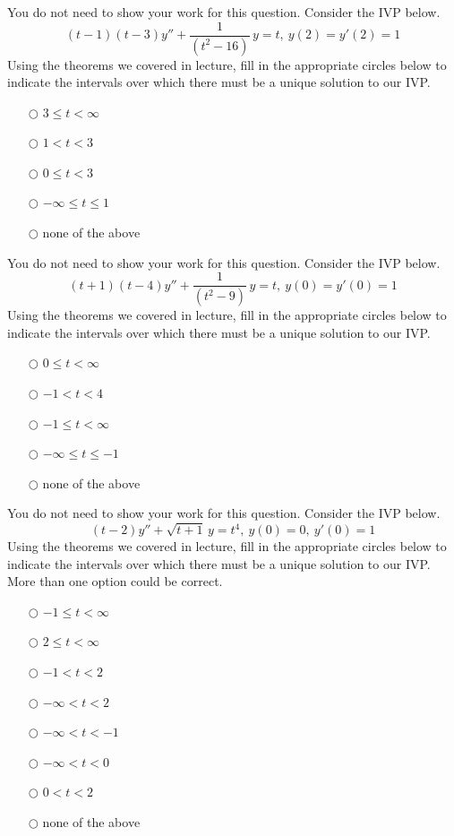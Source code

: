 \ifnum {}
\question[1] You do not need to show your work for this question. Consider the IVP below.
$$\displaystyle (t-1)(t-3) y'' + \frac{1}{(t^2-16)}\,y = t, \ y(2) = y'(2)= 1$$   
Using the theorems we covered in lecture, fill in the appropriate circles below to indicate the intervals over which there must be a unique solution to our IVP.
\begin{itemize}
    \item[$\bigcirc$] $3 \le t < \infty$
    \item[$\bigcirc$] $1 < t < 3$
    \item[$\bigcirc$] $0 \le t < 3$
    \item[$\bigcirc$] $-\infty \le t \le 1$
    \item[$\bigcirc$] none of the above
\end{itemize}
\fi


\ifnum {}
\question[1] You do not need to show your work for this question. Consider the IVP below.
$$\displaystyle (t+1)(t-4) y'' + \frac{1}{(t^2-9)}\,y = t, \ y(0) = y'(0)= 1$$   
Using the theorems we covered in lecture, fill in the appropriate circles below to indicate the intervals over which there must be a unique solution to our IVP.
\begin{itemize}
    \item[$\bigcirc$] $0 \le t < \infty$
    \item[$\bigcirc$] $-1 < t < 4$
    \item[$\bigcirc$] $-1 \le t < \infty$
    \item[$\bigcirc$] $-\infty \le t \le -1$
    \item[$\bigcirc$] none of the above
\end{itemize}
\fi




\ifnum {}
\question[1] You do not need to show your work for this question. Consider the IVP below.
$$\displaystyle (t-2)y'' + \sqrt{t+1}\,y = t^4, \ y(0) = 0, \ y'(0)=1$$   
Using the theorems we covered in lecture, fill in the appropriate circles below to indicate the intervals over which there must be a unique solution to our IVP. More than one option could be correct. 
\begin{itemize}
    \item[$\bigcirc$] $-1 \le t < \infty$
    \item[$\bigcirc$] $2 \le t < \infty$
    \item[$\bigcirc$] $-1 < t < 2$
    \item[$\bigcirc$] $-\infty < t < 2$
    \item[$\bigcirc$] $-\infty < t < -1$
    \item[$\bigcirc$] $-\infty < t < 0$
    \item[$\bigcirc$] $0 < t < 2$
    \item[$\bigcirc$] none of the above
\end{itemize}
\fi




